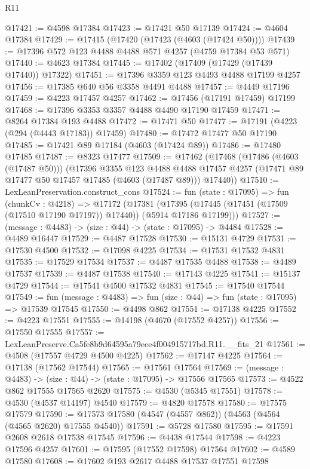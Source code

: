 \begin{lexlean}{R11}
\begin{coremodule}
@17421 := @4598 @17384
@17423 := @17421 @50 @17139
@17424 := @4604 @17384
@17429 := @17415 (@17420 (@17423 (@4603 (@17424 @50))))
@17439 := @17396 @572 @123 @4488 @4488 @571 @4257 (@4759 @17384 @53 @571)
@17440 := @4623 @17384
@17445 := @17402 (@17409 (@17429 (@17439 @17440)) @17322)
@17451 := @17396 @3359 @123 @4493 @4488 @17199 @4257
@17456 := @17385 @640 @56 @3358 @4491 @4488
@17457 := @4449 @17196
@17459 := @4223 @17457 @4257
@17462 := @17456 (@17191 @17459) @17199
@17468 := @17396 @3353 @3357 @4488 @4490 @17190 @17459
@17471 := @8264 @17384 @193 @4488
@17472 := @17471 @50
@17477 := @17191 (@4223 (@294 (@4443 @17183)) @17459)
@17480 := @17472 @17477 @50 @17190
@17485 := @17421 @89 @17184 (@4603 (@17424 @89))
@17486 := @17480 @17485
@17487 := @8323 @17477
@17509 := @17462
    (@17468
      (@17486 (@4603 (@17487 @50)))
      (@17396
        @3355
        @123
        @4488
        @4488
        @17457
        @4257
        (@17471 @89 @17477 @50 @17457 @17485 (@4603 (@17487 @89)))
        @17440))
@17510 := LexLeanPreservation.construct_cons
@17524 := fun (state : @17095) =>
  fun (chunkCv : @4218) =>
  @17172
    (@17381 (@17395 (@17445 (@17451 (@17509 (@17510 @17190 @17197)) @17440)) (@5914 @17186 @17199)))
@17527 := (message : @4483) -> (size : @44) -> (state : @17095) -> @4484
@17528 := @4489 @16447
@17529 := @4487 @17528
@17530 := @15131 @4729
@17531 := @17530 @4500
@17532 := @17098 @4225
@17534 := @17531 @17532 @4831
@17535 := @17529 @17534
@17537 := @4487 @17535 @4488
@17538 := @4489 @17537
@17539 := @4487 @17538
@17540 := @17143 @4225
@17541 := @15137 @4729
@17544 := @17541 @4500 @17532 @4831
@17545 := @17540 @17544
@17549 := fun (message : @4483) => fun (size : @44) => fun (state : @17095) => @17539 @17545
@17550 := @4498 @862
@17551 := @17138 @4225
@17552 := @4223 @17551
@17555 := @14198 (@4670 (@17552 @4257))
@17556 := @17550 @17555
@17557 := LexLeanPreserve.Ca5fe8b9d64595a79eee4f004915717bd.R11.__fits_21
@17561 := @4508 (@17557 @4729 @4500 @4225)
@17562 := @17147 @4225
@17564 := @17138 (@17562 @17544)
@17565 := @17561 @17564
@17569 := (message : @4483) -> (size : @44) -> (state : @17095) -> @17556 @17565
@17573 := @4522 @862 @17555 @17565 @2620
@17575 := @4530 (@5345 @17551)
@17578 := @4530 (@4537 @14197) @4540
@17579 := @4820 @17578
@17580 := @17575 @17579
@17590 := @17573 @17580 (@4547 (@4557 @862)) (@4563 (@4564 (@4565 @2620) @17555 @4540))
@17591 := @5728 @17580
@17595 := @17591 @2608 @2618 @17538 @17545
@17596 := @4438 @17544
@17598 := @4223 @17596 @4257
@17601 := @17595 (@17552 @17598) @17564
@17602 := @4589 @17580
@17608 := @17602 @193 @2617 @4488 @17537 @17551 @17598

\end{coremodule}
\end{lexlean}
